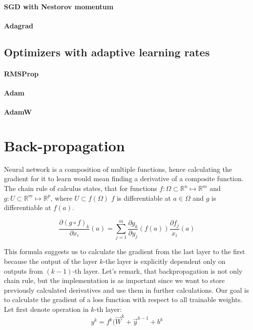 \paragraph{SGD with Nestorov momentum}
\paragraph{Adagrad}
\subsection{Optimizers with adaptive learning rates}
\paragraph{RMSProp}
\paragraph{Adam}
\paragraph{AdamW}
\section{Back-propagation}
Neural network is a composition of multiple functions, hence calculating the gradient for it to learn would mean finding a derivative of a composite function. The chain rule of calculus states, that for functions $f: \Omega \subset \mathbb{R}^n \mapsto \mathbb{R}^m$ and $g: U \subset \mathbb{R}^m \mapsto \mathbb{R}^p$, where $U \subset f(\Omega)$ $f$ is differentiable at $a \in \Omega$ and  $g$ is differentiable at  $f(a)$. 

\begin{equation}
    \frac{\partial(g \circ f)_k}{\partial x_i}(a) = \sum_{j=1}^{m} \frac{\partial g_k}{\partial y_j}(f(a))\frac{\partial f_j}{x_i}(a)
\end{equation}

This formula suggests us to calculate the gradient from the last layer to the first because the output of the layer $k$-the layer is explicitly dependent only on outputs from $(k-1)$-th layer. Let's remark, that backpropagation is not only chain rule, but the implementation is as important since we want to store previously calculated derivatives and use them in further calculations. Our goal is to calculate the gradient of a loss function with respect to all trainable weights. Let first denote operation in $k$-th layer: 
\begin{equation}
    y^k = f^k(\Vec{W}^k + \Vec{y}^{k-1} + b^k
\end{equation}

